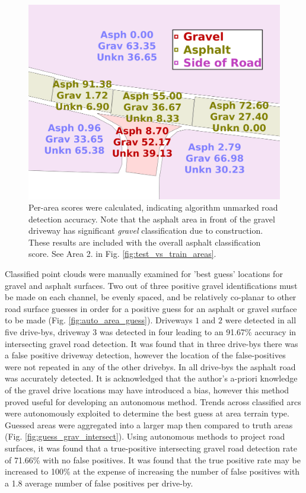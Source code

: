 \documentclass[journal,onecolumn]{IEEEtran}
\begin{document}
		\begin{figure}[H]
			\centering
			\includegraphics[width=0.75\linewidth]{figures/db_4_area_scores_2}
			\caption[Area Scores]{Per-area scores were calculated, indicating algorithm unmarked road detection accuracy. Note that the asphalt area in front of the gravel driveway has significant \textit{gravel} classification due to construction. These results are included with the overall asphalt classification score. See Area 2. in Fig. \ref{fig:test_vs_train_areas}.}
			\label{fig:prepostadjust}
		\end{figure}

		{Classified point clouds were manually examined for 'best guess' locations for gravel and asphalt surfaces. Two out of three positive gravel identifications must be made on each channel, be evenly spaced, and be relatively co-planar to other road surface guesses in order for a positive guess for an asphalt or gravel surface to be made (Fig. \ref{fig:auto_area_guess}). Driveways $1$ and $2$ were detected in all five drive-bys, driveway $3$ was detected in four leading to an 91.67\% accuracy in intersecting gravel road detection. It was found that in three drive-bys there was a false positive driveway detection, however the location of the false-positives were not repeated in any of the other drivebys. In all drive-bys the asphalt road was accurately detected. It is acknowledged that the author's a-priori knowledge of the gravel drive locations may have introduced a bias, however this method proved useful for developing an autonomous method. Trends across classified arcs were autonomously exploited to determine the best guess at area terrain type. Guessed areas were aggregated into a larger map then compared to truth areas (Fig. \ref{fig:guess_grav_intersect}). Using autonomous methods to project road surfaces, it was found that a true-positive intersecting gravel road detection rate of 71.66\% with no false positives. It was found that the true positive rate may be increased to 100\% at the expense of increasing the number of false positives with a 1.8 average number of false positives per drive-by.}
\end{document}
